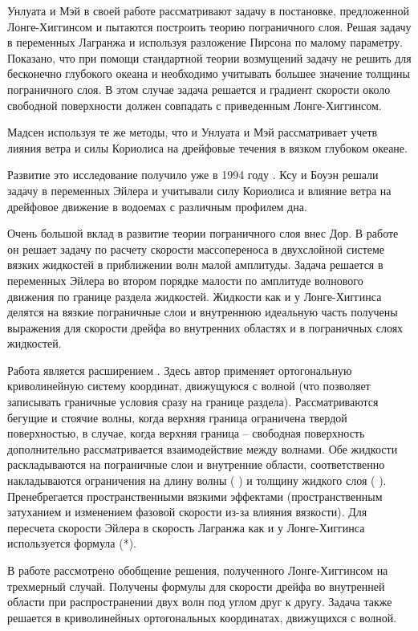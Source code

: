 Унлуата и Мэй \cite{unluata1970mass} в своей работе рассматривают задачу в постановке, предложенной Лонге-Хиггинсом \cite{longuet1953mass, longuet1960mass} и пытаются построить теорию пограничного слоя. Решая задачу в переменных Лагранжа и используя разложение Пирсона по малому параметру. Показано, что при помощи стандартной теории возмущений задачу не решить для бесконечно глубокого океана и необходимо учитывать большее значение толщины пограничного слоя. В этом случае задача решается и градиент скорости около свободной поверхности должен совпадать с приведенным Лонге-Хиггинсом. 

Мадсен \cite{Madsen} используя те же методы, что и Унлуата и Мэй \cite{unluata1970mass} рассматривает учетв лияния ветра и силы Кориолиса на дрейфовые течения в вязком глубоком океане. 

Развитие это исследование получило уже в 1994 году \cite{xu1994wave}. Ксу и Боуэн решали задачу в переменных Эйлера и учитывали силу Кориолиса и влияние ветра на дрейфовое движение в водоемах с различным профилем дна. 

Очень большой вклад в развитие теории пограничного слоя внес Дор. В работе \cite{dore1970mass} он решает задачу по расчету скорости массопереноса в двухслойной системе вязких жидкостей в приближении волн малой амплитуды. Задача решается в переменных Эйлера во втором порядке малости по амплитуде волнового движения по границе раздела жидкостей. Жидкости как и у Лонге-Хиггинса делятся на вязкие пограничные слои и внутреннюю идеальную часть получены выражения для скорости дрейфа во внутренних областях и в пограничных слоях жидкостей. 

Работа \cite{dore1973mass} является расширением \cite{dore1970mass}. Здесь автор применяет ортогональную криволинейную систему координат, движущуюся с волной (что позволяет записывать граничные условия сразу на границе раздела). Рассматриваются бегущие и стоячие волны, когда верхняя граница ограничена твердой поверхностью, в случае, когда верхняя граница – свободная поверхность дополнительно рассматривается взаимодействие между волнами. Обе жидкости раскладываются на пограничные слои и внутренние области, соответственно накладываются ограничения на длину волны ( ) и толщину жидкого слоя ( ). Пренебрегается пространственными вязкими эффектами (пространственным затуханием и изменением фазовой скорости из-за влияния вязкости). Для пересчета скорости Эйлера в скорость Лагранжа как и у Лонге-Хиггинса используется формула (*).

В работе \cite{dore1974mass} рассмотрено обобщение решения, полученного Лонге-Хиггинсом \cite{longuet1953mass} на трехмерный случай. Получены формулы для скорости дрейфа во внутренней области при распространении двух волн под углом   друг к другу. Задача также решается в криволинейных ортогональных координатах, движущихся с волной.

